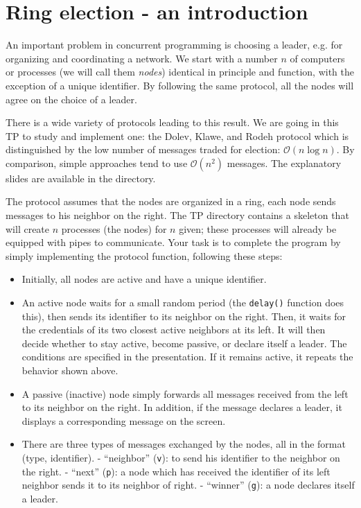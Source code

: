 \documentclass[11pt]{article}
\newcommand{\numtd}{03}
\newcommand{\titretd}{Leader election}
\begin{document}
	
	\entete{\numtd}{\titretd}

\section{Ring election - an introduction}
An important problem in concurrent programming is choosing a leader, e.g. for organizing and coordinating a network. We start with a number $n$ of computers or processes (we will call them \emph{nodes}) identical in principle and function, with the exception of a unique identifier. By following the same protocol, all the nodes will agree on the choice of a leader.

There is a wide variety of protocols leading to this result. We are going in this TP to study and
implement one: the Dolev, Klawe, and Rodeh protocol which is distinguished by the low number of messages
traded for election: $\mathcal{O}(n\log n)$. By comparison, simple approaches tend to use $\mathcal{O}(n^2)$ messages. The explanatory slides are available in the directory.

The protocol assumes that the nodes are organized in a ring, each node sends messages
to his neighbor on the right. The TP directory contains a skeleton that will create $n$ processes (the nodes) for
$n$ given; these processes will already be equipped with pipes to communicate. Your task is to complete the
program by simply implementing the protocol function, following these steps:
\begin{itemize}
	\item  Initially, all nodes are active and have a unique identifier.
	\item An active node waits for a small random period (the \texttt{delay()} function does this), then sends its identifier to its neighbor on the right. Then, it waits for the credentials of its two closest active neighbors at its left. It will then decide whether to stay active, become passive, or declare itself a leader. The conditions are specified in the presentation. If it remains active, it repeats the behavior shown above.
	\item A passive (inactive) node simply forwards all messages received from the left to its neighbor on the right. In addition, if the message declares a leader, it displays a corresponding message on the screen.
	\item There are three types of messages exchanged by the nodes, all in the format (type, identifier).
	- “neighbor” (\texttt{v}): to send his identifier to the neighbor on the right.
	- “next” (\texttt{p}): a node which has received the identifier of its left neighbor sends it to its neighbor
	of right.
	- “winner” (\texttt{g}): a node declares itself a leader.
\end{itemize}
\end{document}
